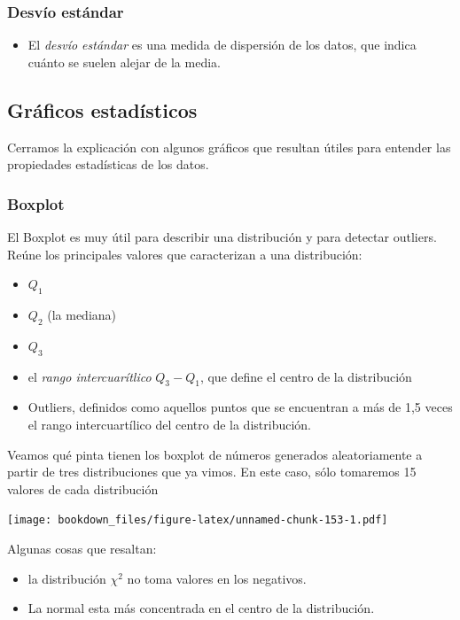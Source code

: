 \documentclass[]{book}
\providecommand{\tightlist}{%
  \setlength{\itemsep}{0pt}\setlength{\parskip}{0pt}}
\begin{document}
\hypertarget{desvio-estandar}{%
\subsubsection{Desvío estándar}\label{desvio-estandar}}

\begin{itemize}
\tightlist
\item
  El \emph{desvío estándar} es una medida de dispersión de los datos, que indica cuánto se suelen alejar de la media.
\end{itemize}

\hypertarget{graficos-estadisticos}{%
\subsection{Gráficos estadísticos}\label{graficos-estadisticos}}

Cerramos la explicación con algunos gráficos que resultan útiles para entender las propiedades estadísticas de los datos.

\hypertarget{boxplot}{%
\subsubsection{Boxplot}\label{boxplot}}

El Boxplot es muy útil para describir una distribución y para detectar outliers. Reúne los principales valores que caracterizan a una distribución:

\begin{itemize}
\tightlist
\item
  \(Q_1\)
\item
  \(Q_2\) (la mediana)
\item
  \(Q_3\)
\item
  el \emph{rango intercuarítlico} \(Q_3 - Q_1\), que define el centro de la distribución
\item
  Outliers, definidos como aquellos puntos que se encuentran a más de 1,5 veces el rango intercuartílico del centro de la distribución.
\end{itemize}

Veamos qué pinta tienen los boxplot de números generados aleatoriamente a partir de tres distribuciones que ya vimos. En este caso, sólo tomaremos 15 valores de cada distribución

\texttt{[image: bookdown\_files/figure-latex/unnamed-chunk-153-1.pdf]}

Algunas cosas que resaltan:

\begin{itemize}
\tightlist
\item
  la distribución \(\chi^2\) no toma valores en los negativos.
\item
  La normal esta más concentrada en el centro de la distribución.
\end{itemize}
\end{document}
